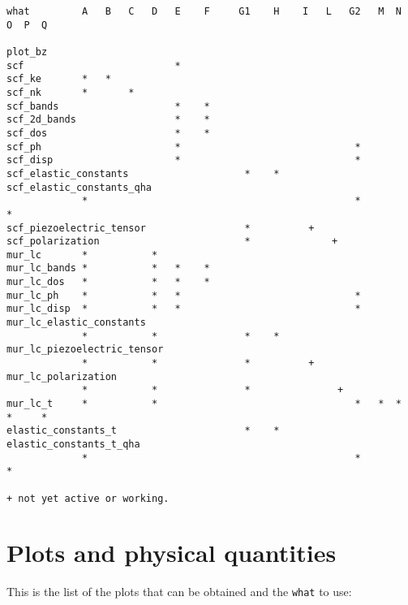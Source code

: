 \documentclass[12pt,a4paper]{article}
\begin{document}
\begin{verbatim}
what         A   B   C   D   E    F     G1    H    I   L   G2   M  N  O  P  Q

plot_bz
scf                          *
scf_ke       *   *
scf_nk       *       *
scf_bands                    *    *
scf_2d_bands                 *    *
scf_dos                      *    *
scf_ph                       *                              *
scf_disp                     *                              *
scf_elastic_constants                    *    *
scf_elastic_constants_qha     
             *                                              *            *
scf_piezoelectric_tensor                 *          +
scf_polarization                         *              +
mur_lc       *           *
mur_lc_bands *           *   *    *
mur_lc_dos   *           *   *    *
mur_lc_ph    *           *   *                              *
mur_lc_disp  *           *   *                              *
mur_lc_elastic_constants
             *           *               *    *
mur_lc_piezoelectric_tensor
             *           *               *          +
mur_lc_polarization
             *           *               *               +
mur_lc_t     *           *                                  *   *  *  *     *
elastic_constants_t                      *    *  
elastic_constants_t_qha
             *                                              *            * 

+ not yet active or working.
\end{verbatim}

\newpage

\section{\color{coral}Plots and physical quantities}
This is the list of the plots that can be obtained and 
the \texttt{what} to use:
\end{document}
